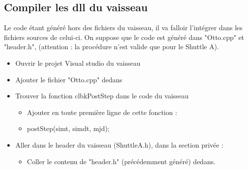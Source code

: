 \documentclass[a4paper,11pt]{article}
\begin{document}
    \subsection{Compiler les dll du vaisseau}
        Le code étant généré hors des fichiers du vaisseau, il va falloir l'intégrer dans les fichiers sources de celui-ci.
        On suppose que le code est généré dans "Otto.cpp" et "header.h", (attention : la procédure n'est valide que pour le Shuttle A).\newline
        \begin{itemize}
            \item Ouvrir le projet Visual studio du vaisseau
            \item Ajouter le fichier "Otto.cpp" dedans
            \item Trouver la fonction clbkPostStep dans le code du vaisseau
            \begin{itemize}
                \item Ajouter en toute première ligne de cette fonction : 
                \item postStep(simt, simdt, mjd);
            \end{itemize}
            \item Aller dans le header du vaisseau (ShuttleA.h), dans la section privée :
            \begin{itemize}
                \item Coller le contenu de "header.h" (précédemment généré) dedans.
            \end{itemize}
            
        \end{itemize}
\end{document}
